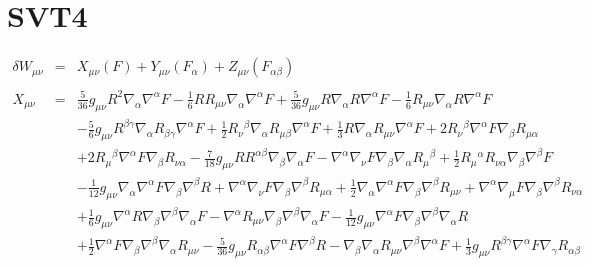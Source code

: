\documentclass[10pt,letterpaper]{article}
\numberwithin{equation}{section}
\begin{document}
\section{SVT4}
\begin{eqnarray}
\delta W_{\mu\nu} &=& X_{\mu\nu}(F) + Y_{\mu\nu}(F_\alpha) + Z_{\mu\nu}(F_{\alpha\beta})
\\ \nonumber\\
%
X_{\mu\nu}&=& \tfrac{5}{36} g_{\mu \nu } R^2 \nabla_{\alpha }\nabla^{\alpha }F -  \tfrac{1}{6} R R_{\mu \nu } \nabla_{\alpha }\nabla^{\alpha }F + \tfrac{5}{36} g_{\mu \nu } R \nabla_{\alpha }R \nabla^{\alpha }F -  \tfrac{1}{6} R_{\mu \nu } \nabla_{\alpha }R \nabla^{\alpha }F \nonumber \\ 
&& -  \tfrac{5}{6} g_{\mu \nu } R^{\beta \gamma } \nabla_{\alpha }R_{\beta \gamma } \nabla^{\alpha }F + \tfrac{1}{2} R_{\nu }{}^{\beta } \nabla_{\alpha }R_{\mu \beta } \nabla^{\alpha }F + \tfrac{1}{3} R \nabla_{\alpha }R_{\mu \nu } \nabla^{\alpha }F + 2 R_{\nu }{}^{\beta } \nabla^{\alpha }F \nabla_{\beta }R_{\mu \alpha } \nonumber \\ 
&& + 2 R_{\mu }{}^{\beta } \nabla^{\alpha }F \nabla_{\beta }R_{\nu \alpha } -  \tfrac{7}{18} g_{\mu \nu } R R^{\alpha \beta } \nabla_{\beta }\nabla_{\alpha }F -  \nabla^{\alpha }\nabla_{\nu }F \nabla_{\beta }\nabla_{\alpha }R_{\mu }{}^{\beta } + \tfrac{1}{2} R_{\mu }{}^{\alpha } R_{\nu \alpha } \nabla_{\beta }\nabla^{\beta }F \nonumber \\ 
&& -  \tfrac{1}{12} g_{\mu \nu } \nabla_{\alpha }\nabla^{\alpha }F \nabla_{\beta }\nabla^{\beta }R + \nabla^{\alpha }\nabla_{\nu }F \nabla_{\beta }\nabla^{\beta }R_{\mu \alpha } + \tfrac{1}{2} \nabla_{\alpha }\nabla^{\alpha }F \nabla_{\beta }\nabla^{\beta }R_{\mu \nu } + \nabla^{\alpha }\nabla_{\mu }F \nabla_{\beta }\nabla^{\beta }R_{\nu \alpha } \nonumber \\ 
&& + \tfrac{1}{6} g_{\mu \nu } \nabla^{\alpha }R \nabla_{\beta }\nabla^{\beta }\nabla_{\alpha }F -  \nabla^{\alpha }R_{\mu \nu } \nabla_{\beta }\nabla^{\beta }\nabla_{\alpha }F -  \tfrac{1}{12} g_{\mu \nu } \nabla^{\alpha }F \nabla_{\beta }\nabla^{\beta }\nabla_{\alpha }R \nonumber \\ 
&& + \tfrac{1}{2} \nabla^{\alpha }F \nabla_{\beta }\nabla^{\beta }\nabla_{\alpha }R_{\mu \nu } -  \tfrac{5}{36} g_{\mu \nu } R_{\alpha \beta } \nabla^{\alpha }F \nabla^{\beta }R -  \nabla_{\beta }\nabla_{\alpha }R_{\mu \nu } \nabla^{\beta }\nabla^{\alpha }F + \tfrac{1}{3} g_{\mu \nu } R^{\beta \gamma } \nabla^{\alpha }F \nabla_{\gamma }R_{\alpha \beta } \nonumber \\ 

\end{eqnarray}
\end{document}
